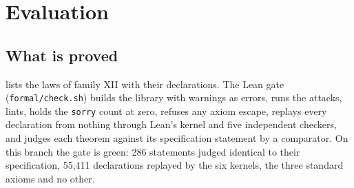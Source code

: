 \documentclass[11pt]{article}
\theoremstyle{plain}
\theoremstyle{definition}
\theoremstyle{remark}
\newcommand{\code}[1]{\texttt{#1}}
\begin{document}
\section{Evaluation}

\subsection{What is proved}

 lists the laws of family XII with their declarations. The Lean gate
(\code{formal/check.sh}) builds the library with warnings as errors, runs the attacks, lints,
holds the \code{sorry} count at zero, refuses any axiom escape, replays every declaration from
nothing through Lean's kernel and five independent checkers, and judges each theorem against
its specification statement by a comparator. On this branch the gate is green: 286 statements
judged identical to their specification, 55,411 declarations replayed by the six kernels, the
three standard axioms and no other.
\end{document}
